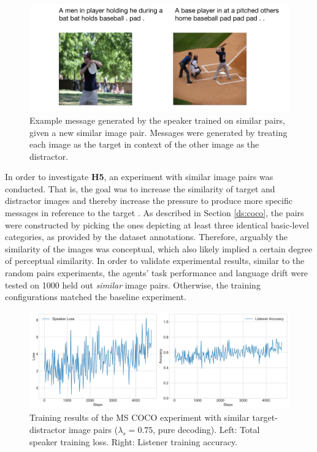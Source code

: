 \begin{figure}[h]
	\centering
	\includegraphics[width=0.8\linewidth]{images/example_generations/coco_speakers_SimilarPairs_example_cropped.pdf}
	\caption{Example message generated by the speaker trained on similar pairs, given a new similar image pair. Messages were generated by treating each image as the target in context of the other image as the distractor.}
	\label{fig:coco_similarPairs_speaker_generation}
\end{figure}
In order to investigate \textbf{H5}, an experiment with similar image pairs was conducted. That is, the goal was to increase the similarity of target and distractor images and thereby increase the pressure to produce more specific messages in reference to the target \parencite[cf.][]{graf2016animal}. As described in Section \ref{ds:coco}, the pairs were constructed by picking the ones depicting at least three identical basic-level categories, as provided by the dataset annotations. Therefore, arguably the similarity of the images was conceptual, which also likely implied a certain degree of perceptual similarity. In order to validate experimental results, similar to the random pairs experiments, the agents' task performance and language drift were tested on 1000 held out \emph{similar} image pairs. 
Otherwise, the training configurations matched the baseline experiment. 

\begin{figure}[h]
	\centering
	\includegraphics[width=\linewidth]{images/coco_similarFixed_075_losses.png}
	\caption{Training results of the MS COCO experiment with similar target-distractor image pairs ($\lambda_s=0.75$, pure decoding). Left: Total speaker training loss. Right: Listener training accuracy.}
	\label{fig:coco_similar_speaker_loss_listener_acc_all}
\end{figure}

